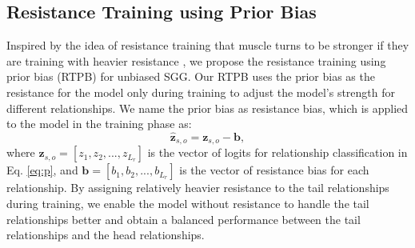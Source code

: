 \subsection{Resistance Training using Prior Bias}
\label{sec:RTPB}
Inspired by the idea of resistance training that muscle turns to be stronger if they are training with heavier resistance \cite{kraemer2004fundamentals},
we propose the resistance training using prior bias (RTPB) for unbiased SGG. Our RTPB uses the prior bias as the resistance for the model only during training to adjust the model's strength for different relationships. We name the prior bias as resistance bias, which is applied to the model in the training phase as:
\begin{equation}
	\hat{\mathbf{z}}_{s,o} = \mathbf{z}_{s,o} - \mathbf{b},
\end{equation}
where $\mathbf{z}_{s,o}= [z_1,z_2,...,z_{L_r}]$ is the vector of logits for relationship classification in Eq. \eqref{eq:p}, and $\mathbf{b} = [b_1, b_2,...,b_{L_r}]$ is the vector of resistance bias for each relationship. 
By assigning relatively heavier resistance to the tail relationships during training, we enable the model without resistance to handle the tail relationships better and obtain a balanced performance between the tail relationships and the head relationships.

